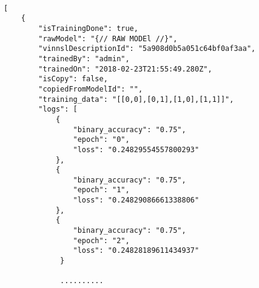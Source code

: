 \begin{lstlisting}

[
    {
        "isTrainingDone": true,
        "rawModel": "{// RAW MODEl //}",
        "vinnslDescriptionId": "5a908d0b5a051c64bf0af3aa",
        "trainedBy": "admin",
        "trainedOn": "2018-02-23T21:55:49.280Z",
        "isCopy": false,
        "copiedFromModelId": "",
        "training_data": "[[0,0],[0,1],[1,0],[1,1]]",
        "logs": [
            {
                "binary_accuracy": "0.75",
                "epoch": "0",
                "loss": "0.24829554557800293"
            },
            {
                "binary_accuracy": "0.75",
                "epoch": "1",
                "loss": "0.24829086661338806"
            },
            {
                "binary_accuracy": "0.75",
                "epoch": "2",
                "loss": "0.24828189611434937"
             }

             ..........



\end{lstlisting}
